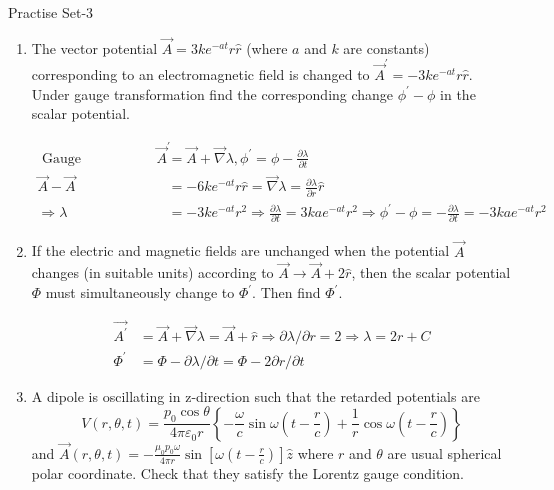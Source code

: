 \newpage
\begin{abox}
	Practise Set-3
\end{abox}
\begin{enumerate}
	\item The vector potential $\vec{A}=3 k e^{-a t} r \hat{r}$ (where $a$ and $k$ are constants) corresponding to an electromagnetic field is changed to $\vec{A}^{\prime}=-3 k e^{-a t} r \hat{r}$. Under gauge transformation find the corresponding change $\phi^{\prime}-\phi$ in the scalar potential.
	\begin{answer}
		\begin{align*}
		\text { Gauge Transformation } \vec{A}^{\prime}&=\vec{A}+\vec{\nabla} \lambda, \phi^{\prime}=\phi-\frac{\partial \lambda}{\partial t}\\
		\vec{A}-\vec{A}&=-6 k e^{-a t} r \hat{r}=\vec{\nabla} \lambda=\frac{\partial \lambda}{\partial r} \hat{r} \\
		\Rightarrow \lambda&=-3 k e^{-a t} r^{2} \Rightarrow \frac{\partial \lambda}{\partial t}=3 k a e^{-a t} r^{2} \Rightarrow \phi^{\prime}-\phi=-\frac{\partial \lambda}{\partial t}=-3 k a e^{-a t} r^{2}
		\end{align*}
	\end{answer}
	\item If the electric and magnetic fields are unchanged when the potential $\vec{A}$ changes (in suitable units) according to $\vec{A} \rightarrow \vec{A}+2 \hat{r}$, then the scalar potential $\Phi$ must simultaneously change to $\Phi^{\prime}$. Then find $\Phi^{\prime}$.
	\begin{answer}
		\begin{align*}
		\overrightarrow{A^{\prime}}&=\vec{A}+\vec{\nabla} \lambda=\vec{A}+\hat{r} \Rightarrow \partial \lambda / \partial r=2 \Rightarrow \lambda=2 r+C\\
		\Phi^{\prime}&=\Phi-\partial \lambda / \partial t=\Phi-2 \partial r / \partial t
		\end{align*}
	\end{answer}
	\item A dipole is oscillating in z-direction such that the retarded potentials are
	$$
	V(r, \theta, t)=\frac{p_{0} \cos \theta}{4 \pi \varepsilon_{0} r}\left\{-\frac{\omega}{c} \sin \omega\left(t-\frac{r}{c}\right)+\frac{1}{r} \cos \omega\left(t-\frac{r}{c}\right)\right\}
	$$
	and $\vec{A}(r, \theta, t)=-\frac{\mu_{0} p_{0} \omega}{4 \pi r} \sin \left[\omega\left(t-\frac{r}{c}\right)\right] \hat{z}$
	where $r$ and $\theta$ are usual spherical polar coordinate.
	Check that they satisfy the Lorentz gauge condition.

\end{enumerate}
